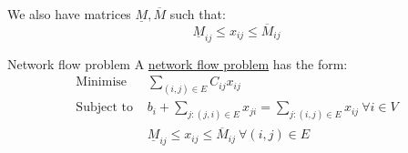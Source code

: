 \documentclass[../Main.tex]{subfiles}
\begin{document}
We also have matrices $\underline{M}, \overline{M}$ such that:
\begin{equation*}
    \underline{M}_{ij} \leq x_{ij} \leq \overline{M}_{ij}
\end{equation*}
\begin{definition}{Network flow problem}
    A \underline{network flow problem} has the form:
    \begin{align*}
        \text{Minimise } & \sum_{(i, j) \in E} C_{ij} x_{ij} \\
        \text{Subject to } & b_i + \sum_{j : (j, i) \in E} x_{ji} = \sum_{j : (i, j) \in E} x_{ij} ~\forall i \in V \\
        & \underline{M}_{ij} \leq x_{ij} \leq \overline{M}_{ij}~\forall (i, j) \in E
    \end{align*}
\end{definition}
\end{document}
